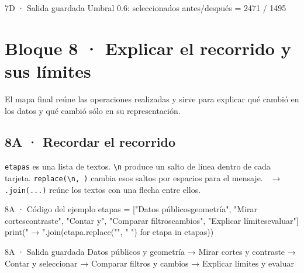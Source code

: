 
\begin{Salida}{7D · Salida guardada}
Umbral 0.6: seleccionados antes/después = 2471 / 1495
\end{Salida}


\clearpage

\section*{Bloque 8 · Explicar el recorrido y sus límites}


\label{vivo:bloque8}

El mapa final reúne las operaciones realizadas y sirve para explicar qué cambió en los datos y qué cambió sólo en su representación.


\subsection*{8A · Recordar el recorrido}

\label{vivo:8a}

\texttt{\small etapas} es una lista de textos. \texttt{\small \textbackslash{}n} produce un salto de línea dentro de cada tarjeta. \texttt{\small replace(\allowbreak{}\textquotedbl{}\textbackslash{}n\textquotedbl{},\allowbreak{} \textquotedbl{} \textquotedbl{})\allowbreak{}} cambia esos saltos por espacios para el mensaje. \texttt{\small \textquotedbl{} $\rightarrow$ \textquotedbl{}.\allowbreak{}join(\allowbreak{}.\allowbreak{}.\allowbreak{}.\allowbreak{})\allowbreak{}} reúne los textos con una flecha entre ellos.

\begin{CodigoVivo}{8A · Código del ejemplo}
etapas = ["Datos públicos\ny geometría", "Mirar cortes\ny contraste", "Contar y\nseleccionar", "Comparar filtros\ny cambios", "Explicar límites\ny evaluar"]
print(" → ".join(etapa.replace("\n", " ") for etapa in etapas))
\end{CodigoVivo}


\begin{Salida}{8A · Salida guardada}
Datos públicos y geometría → Mirar cortes y contraste → Contar y seleccionar → Comparar filtros y cambios → Explicar límites y evaluar
\end{Salida}


